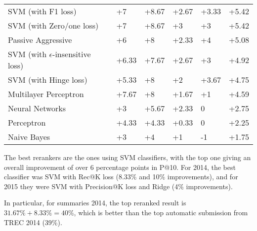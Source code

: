 \begin{table}[h!]
{\begin{tabular}{@{}llllll@{}}
SVM (with F1 loss)                                       & +7                       & +8.67                       & +2.67                    & +3.33                       & +5.42             \\ 
SVM (with Zero/one loss)                                        & +7                       & +8.67                       & +3                       & +3                          & +5.42             \\ 
Passive Aggressive                             & +6                       & +8                          & +2.33                    & +4                          & +5.08             \\ 
SVM (with $\epsilon$-insensitive loss)                            & +6.33                    & +7.67                       & +2.67                    & +3                          & +4.92             \\ 
SVM (with Hinge loss)                                     & +5.33                    & +8                          & +2                       & +3.67                       & +4.75             \\ 
Multilayer Perceptron                           & +7.67                    & +8                          & +1.67                    & +1                          & +4.59             \\ 
Neural Networks                               & +3                       & +5.67                       & +2.33                    & 0                          & +2.75             \\ 
Perceptron                                      & +4.33                    & +4.33                       & +0.33                    & 0                          & +2.25             \\ 
Naive Bayes                                      & +3                       & +4                          & +1                       & -1                         & +1.75             \\ \bottomrule
\end{tabular}%
}
\end{table}

The best rerankers are the ones using SVM classifiers, with the top one giving an overall improvement of over 6 percentage
points in P@10. For 2014, the best classifier was SVM with Rec@K loss (8.33\% and 10\% improvements), 
and for 2015 they were SVM with Precision@K loss and Ridge (4\% improvements).

In particular, for summaries 2014, the top reranked result is $31.67\%+8.33\% = 40\%$, which is better than the top automatic submission
from TREC 2014 (39\%).

